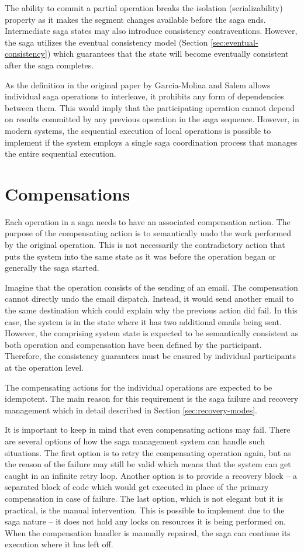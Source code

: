 \documentclass[oneside,
  digital, %
  table,   %
  lof,     %
  lot,     %
]{fithesis3}
\begin{document}
The ability to commit a partial operation breaks the isolation (serializability) property as it makes the segment changes available before the saga ends. Intermediate saga states may also introduce consistency contraventions. However, the saga utilizes the eventual consistency model (Section \ref{sec:eventual-consistency}) which guarantees that the state will become eventually consistent after the saga completes.

As the definition in the original paper by Garcia-Molina and Salem \cite{sagas_publ} allows individual saga operations to interleave, it prohibits any form of dependencies between them. This would imply that the participating operation cannot depend on results committed by any previous operation in the saga sequence. However, in modern systems, the sequential execution of local operations is possible to implement if the system employs a single saga coordination process that manages the entire sequential execution.

\section{Compensations}

Each operation in a saga needs to have an associated compensation action. The purpose of the compensating action is to semantically undo the work performed by the original operation. This is not necessarily the contradictory action that puts the system into the same state as it was before the operation began or generally the saga started. 

Imagine that the operation consists of the sending of an email. The compensation cannot directly undo the email dispatch. Instead, it would send another email to the same destination which could explain why the previous action did fail. In this case, the system is in the state where it has two additional emails being sent. However, the comprising system state is expected to be semantically consistent as both operation and compensation have been defined by the participant. Therefore, the consistency guarantees must be ensured by individual participants at the operation level.

The compensating actions for the individual operations are expected to be idempotent. The main reason for this requirement is the saga failure and recovery management which in detail described in Section \ref{sec:recovery-modes}.

It is important to keep in mind that even compensating actions may fail. There are several options of how the saga management system can handle such situations. The first option is to retry the compensating operation again, but as the reason of the failure may still be valid which means that the system can get caught in an infinite retry loop. Another option is to provide a recovery block -- a separated block of code which would get executed in place of the primary compensation in case of failure. The last option, which is not elegant but it is practical, is the manual intervention. This is possible to implement due to the saga nature -- it does not hold any locks on resources it is being performed on. When the compensation handler is manually repaired, the saga can continue its execution where it has left off.
\end{document}
